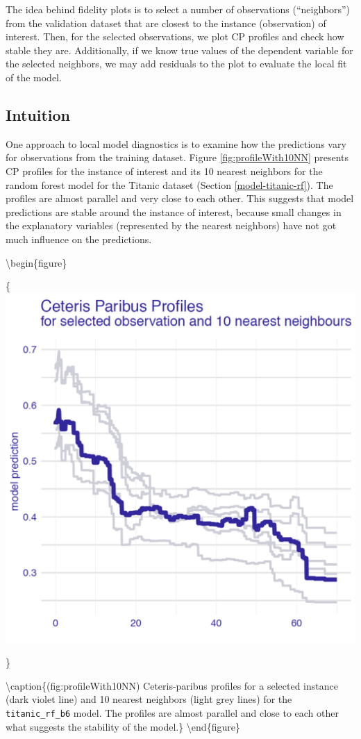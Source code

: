 \documentclass[12pt,]{krantz}
\begin{document}
The idea behind fidelity plots is to select a number of observations (``neighbors'') from the validation dataset that are closest to the instance (observation) of interest. Then, for the selected observations, we plot CP profiles and check how stable they are. Additionally, if we know true values of the dependent variable for the selected neighbors, we may add residuals to the plot to evaluate the local fit of the model.

\hypertarget{cPLocDiagIntuition}{%
\subsection{Intuition}\label{cPLocDiagIntuition}}

One approach to local model diagnostics is to examine how the predictions vary for observations from the training dataset. Figure \ref{fig:profileWith10NN} presents CP profiles for the instance of interest and its 10 nearest neighbors for the random forest model for the Titanic dataset (Section \ref{model-titanic-rf}). The profiles are almost parallel and very close to each other. This suggests that model predictions are stable around the instance of interest, because small changes in the explanatory variables (represented by the nearest neighbors) have not got much influence on the predictions.

\textbackslash{}begin\{figure\}

\{\centering \includegraphics[width=0.5\linewidth]{figure/example_cp}

\}

\textbackslash{}caption\{(fig:profileWith10NN) Ceteris-paribus profiles for a selected instance (dark violet line) and 10 nearest neighbors (light grey lines) for the \texttt{titanic\_rf\_b6} model. The profiles are almost parallel and close to each other what suggests the stability of the model.\}\label{fig:profileWith10NN}
\textbackslash{}end\{figure\}
\end{document}
